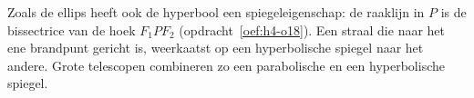 Zoals de ellips heeft ook de hyperbool een spiegeleigenschap: de raaklijn in $P$ is de bissectrice van de hoek $F_1PF_2$ (opdracht~\ref{oef:h4-o18}). Een straal die naar het ene brandpunt gericht is, weerkaatst op een hyperbolische spiegel naar het andere. Grote telescopen combineren zo een parabolische en een hyperbolische spiegel.

\begin{oefeningen}
\end{oefeningen}

\opdrachtenkop

\begin{oefeningen}



















\end{oefeningen}



\begin{oefeningen}


\end{oefeningen}

